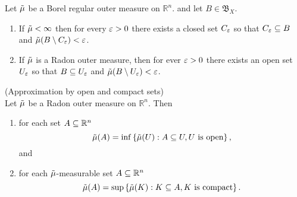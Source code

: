 \begin{lemma}\cite[lemma 1]{evans1991measure}
  Let $\tilde{\mu}$ be a Borel regular outer measure on $ \mathbb{R}^n$. and let
  $B\in \mathfrak{B}_X$.
  \begin{enumerate}
    \item If $\tilde{\mu} < \infty$ then for every $\varepsilon>0$ there exists a closed
      set $C_\varepsilon$ so that $C_\varepsilon \subseteq B$ and $\tilde{\mu}(B\setminus C_\varepsilon)<\varepsilon$.
    \item If $\tilde{\mu}$ is a Radon outer measure, then for ever $\varepsilon>0$ there
      exists an open set $U_\varepsilon$ so that $B\subseteq U_\varepsilon$ and
    $\tilde{\mu}(B\setminus U_\varepsilon)< \varepsilon$.
  \end{enumerate}
\end{lemma}

\begin{thm}\cite[thm 4]{evans1991measure}(Approximation by open and
  compact sets)\\
  Let $\tilde{\mu}$ be a Radon outer measure on $\mathbb{R}^n$. Then
  \begin{enumerate}
    \item for each set $A\subseteq \mathbb{R}^n$
      \begin{equation*}
        \tilde{\mu}(A) = \inf\left\{ \tilde{\mu}(U):A\subseteq U, U \text{ is open} \right\},
      \end{equation*}
      and
    \item for each $\tilde{\mu}$-measurable set $A\subseteq \mathbb{R}^n$
      \begin{equation*}
        \tilde{\mu}(A) = \sup\left\{ \tilde{\mu}(K):K\subseteq A, K \text{ is compact}
      \right\}.
      \end{equation*}
  \end{enumerate}
\end{thm}

